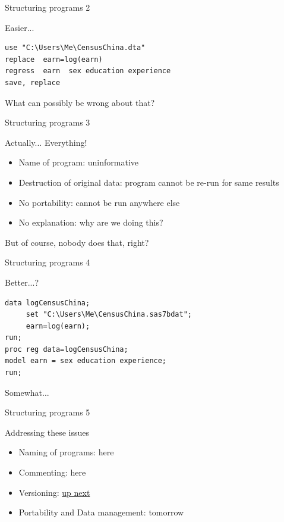 \documentclass[xcolor=table,compress]{beamer}
\begin{document}
\begin{frame}[fragile]{Structuring programs 2}
\begin{block}{Easier...}
\lstset{numbers=left, stepnumber=1,  language=SAS, basicstyle=\tiny,
caption=mystuff.do}
\begin{lstlisting}
use "C:\Users\Me\CensusChina.dta"
replace  earn=log(earn)
regress  earn  sex education experience
save, replace
\end{lstlisting}
What can possibly be wrong about that?
\end{block}
\end{frame}



\begin{frame}{Structuring programs 3}
\begin{block}{Actually...}
{\Large Everything!}
\begin{itemize}
\item Name of program: uninformative
\item Destruction of original data: program cannot be re-run for same results
\item No portability: cannot be run anywhere else
\item No explanation: why are we doing this?
\end{itemize}
\end{block}
But of course, nobody does that, right?
\end{frame}


\begin{frame}[fragile]{Structuring programs 4}
\begin{block}{Better...?}

\lstset{numbers=left, stepnumber=1,  language=SAS, basicstyle=\tiny,
caption=china-regression.sas}
\begin{lstlisting}
data logCensusChina;
     set "C:\Users\Me\CensusChina.sas7bdat";
     earn=log(earn);
run;
proc reg data=logCensusChina;
model earn = sex education experience;
run;
\end{lstlisting}
\pause
Somewhat...
\end{block}
\end{frame}




\begin{frame}{Structuring programs 5}
\begin{block}{Addressing these issues}
\begin{itemize}
\item Naming of programs: here
\item Commenting: here
\item Versioning: \href{day1-2.pdf}{up next}
\item Portability and Data management: tomorrow
\end{itemize}
\end{block}
\end{frame}
\end{document}

